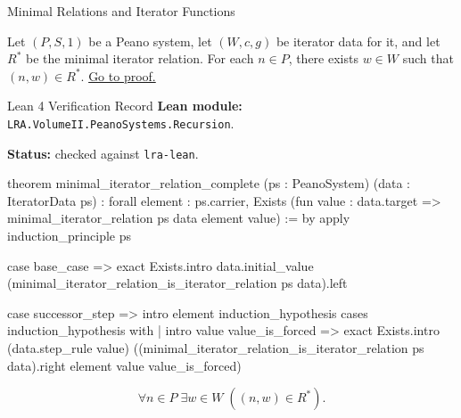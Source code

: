 \begin{topicbox}{Minimal Relations and Iterator Functions}
\begin{tcolorbox}[colback=lembox, colframe=lemborder, arc=2pt,
  left=6pt, right=6pt, top=4pt, bottom=4pt,
  title={\small\textbf{Lemma (Completeness of the Minimal Iterator Relation)}},
  fonttitle=\small\bfseries]
\begin{lemma}
\label{lem:minimal-iterator-relation-complete}
Let $(P,S,1)$ be a Peano system, let $(W,c,g)$ be iterator data for it, and let
$R^*$ be the minimal iterator relation. For each $n\in P$, there exists
$w\in W$ such that $(n,w)\in R^*$.
\hyperref[prf:minimal-iterator-relation-complete]{Go to proof.}
\end{lemma}
\end{tcolorbox}

\begin{formalizationrecord}{Lean 4 Verification Record}
\textbf{Lean module:} \texttt{LRA.VolumeII.PeanoSystems.Recursion}.\par
{}
\textbf{Status:} checked against \texttt{lra-lean}.\par

\begin{leancode}
theorem minimal_iterator_relation_complete
    (ps : PeanoSystem)
    (data : IteratorData ps) :
    forall element : ps.carrier,
      Exists (fun value : data.target =>
        minimal_iterator_relation ps data element value) := by
  apply induction_principle ps

  case base_case =>
    exact
      Exists.intro
        data.initial_value
        (minimal_iterator_relation_is_iterator_relation ps data).left

  case successor_step =>
    intro element induction_hypothesis
    cases induction_hypothesis with
    | intro value value_is_forced =>
        exact
          Exists.intro
            (data.step_rule value)
            ((minimal_iterator_relation_is_iterator_relation ps data).right
              element value value_is_forced)
\end{leancode}
\end{formalizationrecord}

\begin{remark*}
\[
\forall n\in P\;\exists w\in W\;((n,w)\in R^*).
\]
\end{remark*}


\end{topicbox}
